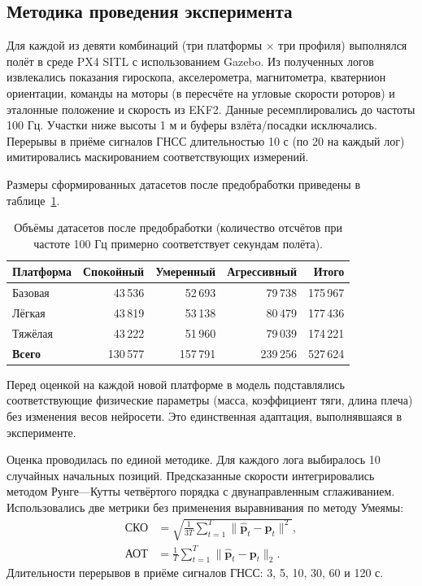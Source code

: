 \subsection{Методика проведения эксперимента}

Для каждой из девяти комбинаций (три платформы × три профиля) выполнялся полёт в среде PX4 SITL с использованием Gazebo. Из полученных логов извлекались показания гироскопа, акселерометра, магнитометра, кватернион ориентации, команды на моторы (в пересчёте на угловые скорости роторов) и эталонные положение и скорость из EKF2. Данные ресемплировались до частоты 100 Гц. Участки ниже высоты 1 м и буферы взлёта/посадки исключались. Перерывы в приёме сигналов ГНСС длительностью 10 с (по 20 на каждый лог) имитировались маскированием соответствующих измерений. 

Размеры сформированных датасетов после предобработки приведены в таблице~\ref{tab:dataset_sizes}.

\begin{table}[htbp]
\centering
\caption{Объёмы датасетов после предобработки (количество отсчётов при частоте 100 Гц примерно соответствует секундам полёта).}
\label{tab:dataset_sizes}
\begin{tabular}{lrrrr}
\toprule
\textbf{Платформа} & \textbf{Спокойный} & \textbf{Умеренный} &
\textbf{Агрессивный} & \textbf{Итого} \\
\midrule
Базовая        & 43\,536 & 52\,693 & 79\,738 & 175\,967 \\
Лёгкая & 43\,819 & 53\,138 & 80\,479 & 177\,436 \\
Тяжёлая & 43\,222 & 51\,960 & 79\,039 & 174\,221 \\
\midrule
\textbf{Всего}       & 130\,577 & 157\,791 & 239\,256 & 527\,624 \\
\bottomrule
\end{tabular}
\end{table}

Перед оценкой на каждой новой платформе в модель подставлялись соответствующие физические параметры (масса, коэффициент тяги, длина плеча) без изменения весов нейросети. Это единственная адаптация, выполнявшаяся в эксперименте.

Оценка проводилась по единой методике. Для каждого лога выбиралось 10 случайных начальных позиций. Предсказанные скорости интегрировались методом Рунге—Кутты четвёртого порядка с двунаправленным сглаживанием. Использовались две метрики без применения выравнивания по методу Умеямы:
\begin{align}
\text{СКО} &= \sqrt{\frac{1}{3T}\sum_{t=1}^{T}\|\hat{\mathbf{p}}_t - \mathbf{p}_t\|^2}, \\
\text{АОТ} &= \frac{1}{T}\sum_{t=1}^{T}\|\hat{\mathbf{p}}_t - \mathbf{p}_t\|_2.
\end{align}
Длительности перерывов в приёме сигналов ГНСС: 3, 5, 10, 30, 60 и 120 с.


